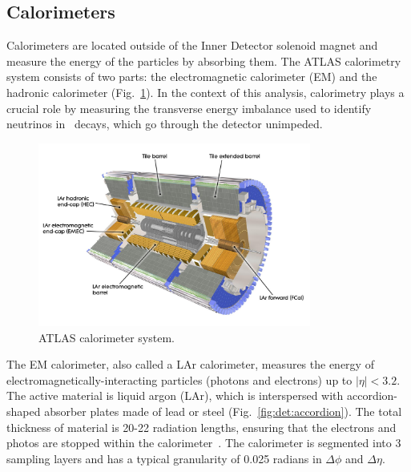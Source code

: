 \subsection{ Calorimeters }

Calorimeters are located outside of the Inner Detector solenoid magnet and measure the energy of the particles by absorbing them. The ATLAS calorimetry system consists of two parts: the electromagnetic calorimeter (EM) and the hadronic calorimeter (Fig.~\ref{fig:det:calo}). In the context of this analysis, calorimetry plays a crucial role by measuring the transverse energy imbalance used to identify neutrinos in \Wmn\ decays, which go through the detector unimpeded.

\begin{figure}[phtb]
  \begin{center}
    \includegraphics[width=0.80\textwidth]{det/fig/calo}
    \caption{ ATLAS calorimeter system. }
    \label{fig:det:calo}
  \end{center}
\end{figure}

The EM calorimeter, also called a LAr calorimeter, measures the energy of electromagnetically-interacting particles (photons and electrons) up to $|\eta|<3.2$. The active material is liquid argon (LAr), which is interspersed with accordion-shaped absorber plates made of lead or steel (Fig.~\ref{fig:det:accordion}). The total thickness of material is 20-22 radiation lengths, ensuring that the electrons and photos are stopped within the calorimeter~\cite{lar_tdr}. The calorimeter is segmented into 3 sampling layers and has a typical granularity of 0.025 radians in $\Delta\phi$ and $\Delta\eta$.

